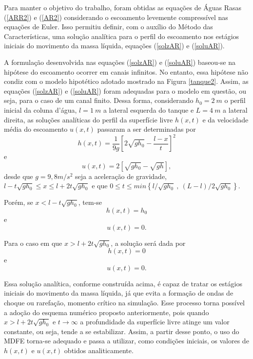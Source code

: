 Para manter o objetivo do trabalho, foram obtidas as equações de Águas Rasas (\ref{ARR2}) e (\ref{AR2}) considerando o escoamento levemente compressível nas equações de Euler. Isso permitiu definir, com o auxílio do Método das Características, uma solução analítica para o perfil do escoamento nos estágios iniciais do movimento da massa líquida, equações (\ref{solzAR}) e (\ref{soluAR}).

A formulação desenvolvida nas equações (\ref{solzAR}) e (\ref{soluAR}) baseou-se na hipótese do escoamento ocorrer em canais infinitos. No entanto, essa hipótese não condiz com o modelo hipotético adotado mostrado na Figura \ref{tanque2}. Assim, as equações (\ref{solzAR}) e (\ref{soluAR}) foram adequadas para o modelo em questão, ou seja, para o caso de um canal finito. Dessa forma, considerando $h_0=2 \ m$ o perfil inicial da coluna d'água, $l=1 \ m$ a lateral esquerda do tanque e $L=4 \ m$ a lateral direita, as soluções analíticas do perfil da superfície livre $h(x,t)$ e da velocidade média do escoamento $u(x,t)$ passaram a ser determinadas por 
\begin{equation} \label{solzMod}
	h(x,t)= \frac{1}{9g} \left[2 \sqrt{gh_0} - \frac{l-x}{t} \right]^2
\end{equation}
e
\begin{equation} \label{soluMod}
	u(x,t)=2 \left[ \sqrt{gh_0} - \sqrt{gh} \right],
\end{equation}
desde que $g=9,8m/s^2$ seja a aceleração de gravidade, $l-t \sqrt{gh_0} \leq x \leq l+2t \sqrt{gh_0}$ e que $0 \leq t \leq min \left\{l/ \sqrt{gh_0}\ ,\ (L-l)/2 \sqrt{gh_0} \right\}$.

Porém, se $x<l-t \sqrt{gh_0}$, tem-se
\begin{equation} \label{solzMod1}
	h(x,t)=h_0
\end{equation}
e
\begin{equation} \label{soluMod1}
	u(x,t)=0.
\end{equation}

Para o caso em que $x>l+2t \sqrt{gh_0}$, a solução será dada por
\begin{equation} \label{solzMod2}
	h(x,t)=0
\end{equation}
e
\begin{equation} \label{soluMod2}
	u(x,t)=0.
\end{equation}

Essa solução analítica, conforme construída acima, é capaz de tratar os estágios iniciais do movimento da massa líquida, já que evita a formação de ondas de choque ou rarefação, momento crítico na simulação. Esse processo torna possível a adoção do esquema numérico proposto anteriormente, pois quando $x>l+2t \sqrt{gh_0}$ e  $t \longrightarrow \infty$ a profundidade da superfície livre atinge um valor constante, ou seja, tende a se estabilizar. Assim, a partir desse ponto, o uso do MDFE torna-se adequado e passa a utilizar, como condições iniciais, os valores de $h(x,t)$ e $u(x,t)$ obtidos analiticamente.

